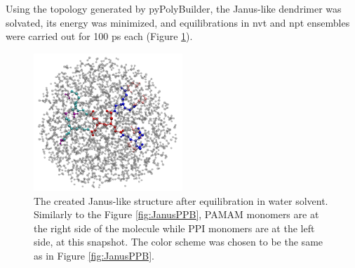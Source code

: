 Using the topology generated by pyPolyBuilder, the Janus-like dendrimer was solvated, its energy was minimized, and equilibrations in nvt and npt ensembles were carried out for 100 ps each (Figure \ref{fig:JanusSOL}).

\begin{figure}
    \centering
    \includegraphics[width=0.5\textwidth]{PAMAM_PPI-Janus/PAMAM_PPISOL.pdf}
    \caption{The created Janus-like structure after equilibration in water solvent.
    Similarly to the Figure \ref{fig:JanusPPB}, PAMAM monomers are at the right side of the molecule while PPI monomers are at the left side, at this snapshot.
    The color scheme was chosen to be the same as in Figure \ref{fig:JanusPPB}.}
    \label{fig:JanusSOL}
\end{figure}
